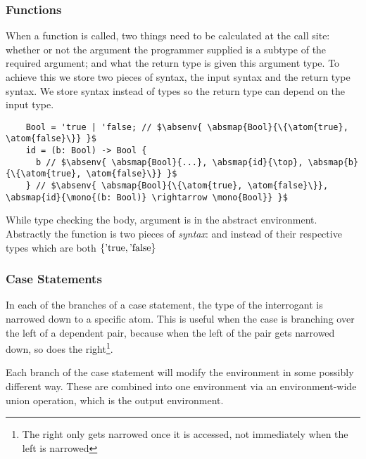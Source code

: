 \documentclass[12pt,twoside]{report}
\begin{document}
\subsubsection{Functions}
When a function is called, two things need to be calculated at the call site: whether or not the argument the programmer supplied is a subtype of the required argument; and what the return type is given this argument type. To achieve this we store two pieces of syntax, the input syntax and the return type syntax. We store syntax instead of types so the return type can depend on the input type.

\begin{listing}[H]
  \begin{verbatim}
    Bool = 'true | 'false; // $\absenv{ \absmap{Bool}{\{\atom{true}, \atom{false}\}} }$
    id = (b: Bool) -> Bool {
      b // $\absenv{ \absmap{Bool}{...}, \absmap{id}{\top}, \absmap{b}{\{\atom{true}, \atom{false}\}} }$
    } // $\absenv{ \absmap{Bool}{\{\atom{true}, \atom{false}\}}, \absmap{id}{\mono{(b: Bool)} \rightarrow \mono{Bool}} }$
  \end{verbatim}
  \caption{While type checking the body, argument  is in the abstract environment. Abstractly the function is two pieces of \textit{syntax}:  and  instead of their respective types which are both $\{\atom{true}, \atom{false}\}$}
\end{listing}



\subsubsection{Case Statements}
In each of the branches of a case statement, the type of the interrogant is narrowed down to a specific atom. This is useful when the case is branching over the left of a dependent pair, because when the left of the pair gets narrowed down, so does the right\footnote{The right only gets narrowed once it is accessed, not immediately when the left is narrowed}.

Each branch of the case statement will modify the environment in some possibly different way. These are combined into one environment via an environment-wide union operation, which is the output environment.
\end{document}
